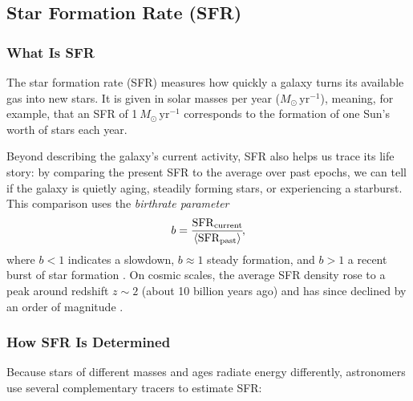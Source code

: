 \documentclass[english,bachelor,oneside]{ctufit-thesis}
\begin{document}
\subsection{Star Formation Rate (SFR)}

\subsubsection{What Is SFR}
The star formation rate (SFR) measures how quickly a galaxy turns its available gas into new stars. It is given in solar masses per year ($M_{\odot}\,\mathrm{yr}^{-1}$), meaning, for example, that an SFR of 1 $M_{\odot}\,\mathrm{yr}^{-1}$ corresponds to the formation of one Sun’s worth of stars each year.  

Beyond describing the galaxy’s current activity, SFR also helps us trace its life story: by comparing the present SFR to the average over past epochs, we can tell if the galaxy is quietly aging, steadily forming stars, or experiencing a starburst. This comparison uses the \emph{birthrate parameter}
\[
  b = \frac{\mathrm{SFR}_{\rm current}}{\langle \mathrm{SFR}_{\rm past}\rangle}\!,
\]
where $b<1$ indicates a slowdown, $b\approx1$ steady formation, and $b>1$ a recent burst of star formation \cite{brinchmann2004physical}. On cosmic scales, the average SFR density rose to a peak around redshift $z\sim2$ (about 10 billion years ago) and has since declined by an order of magnitude \cite{MadauDickinson2014}.

\subsubsection{How SFR Is Determined}
Because stars of different masses and ages radiate energy differently, astronomers use several complementary tracers to estimate SFR:
\end{document}
